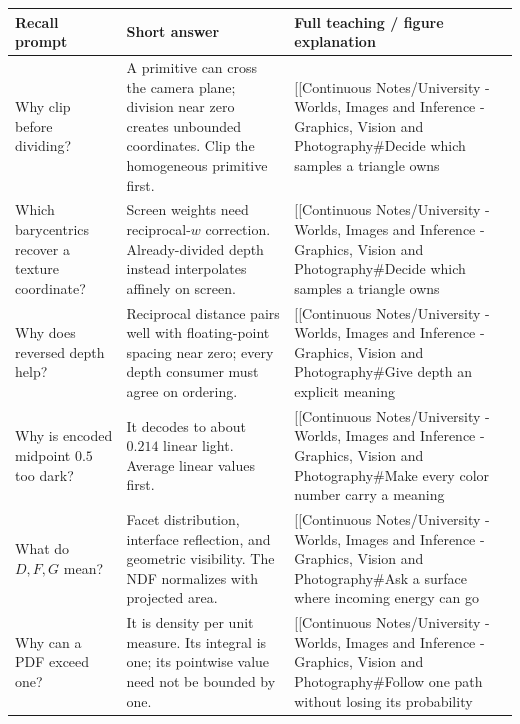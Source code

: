 {\def\LTcaptype{none} %
\begin{longtable}[]{@{}
  >{\raggedright\arraybackslash}p{}
  >{\raggedright\arraybackslash}p{}
  >{\raggedright\arraybackslash}p{}@{}}
\toprule\noalign{}
\begin{minipage}[b]{\linewidth}\raggedright
Recall prompt
\end{minipage} & \begin{minipage}[b]{\linewidth}\raggedright
Short answer
\end{minipage} & \begin{minipage}[b]{\linewidth}\raggedright
Full teaching / figure explanation
\end{minipage} \\
\midrule\noalign{}
\endhead
\bottomrule\noalign{}
\endlastfoot
Why clip before dividing? & A primitive can cross the camera plane; division near zero creates unbounded coordinates. Clip the homogeneous primitive first. & {[}{[}Continuous Notes/University - Worlds, Images and Inference - Graphics, Vision and Photography\#Decide which samples a triangle owns \\
Which barycentrics recover a texture coordinate? & Screen weights need reciprocal-\(w\) correction. Already-divided depth instead interpolates affinely on screen. & {[}{[}Continuous Notes/University - Worlds, Images and Inference - Graphics, Vision and Photography\#Decide which samples a triangle owns \\
Why does reversed depth help? & Reciprocal distance pairs well with floating-point spacing near zero; every depth consumer must agree on ordering. & {[}{[}Continuous Notes/University - Worlds, Images and Inference - Graphics, Vision and Photography\#Give depth an explicit meaning \\
Why is encoded midpoint \(0.5\) too dark? & It decodes to about \(0.214\) linear light. Average linear values first. & {[}{[}Continuous Notes/University - Worlds, Images and Inference - Graphics, Vision and Photography\#Make every color number carry a meaning \\
What do \(D,F,G\) mean? & Facet distribution, interface reflection, and geometric visibility. The NDF normalizes with projected area. & {[}{[}Continuous Notes/University - Worlds, Images and Inference - Graphics, Vision and Photography\#Ask a surface where incoming energy can go \\
Why can a PDF exceed one? & It is density per unit measure. Its integral is one; its pointwise value need not be bounded by one. & {[}{[}Continuous Notes/University - Worlds, Images and Inference - Graphics, Vision and Photography\#Follow one path without losing its probability \\

\end{longtable}}
